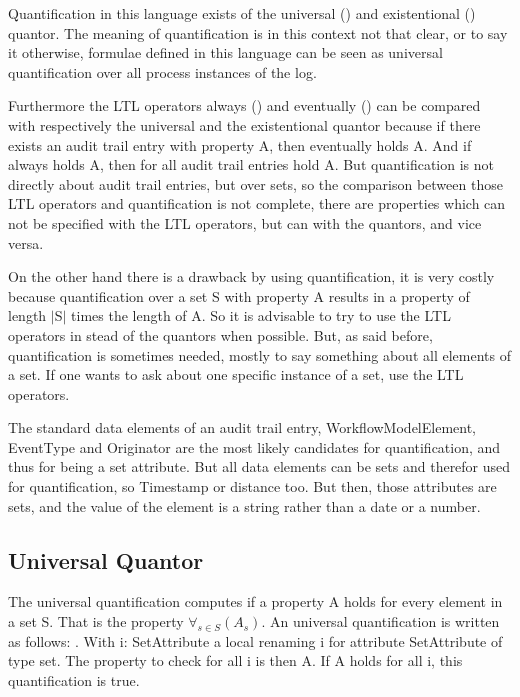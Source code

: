 Quantification in this language exists of the universal () and
existentional () quantor. The meaning of quantification is in this context not that
clear, or to say it otherwise, formulae defined in this language can be seen
as universal quantification over all process instances of the log.

Furthermore the LTL operators always (\ltl{[]}) and eventually (\ltl{$<>$}) can
be compared with respectively the universal and the existentional quantor
because if there exists an audit trail entry with
property A, then eventually holds A. And if always holds A, then for all audit
trail entries hold A. But quantification is not directly about audit trail
entries, but over sets, so the comparison between those LTL operators and
quantification is not complete, there are properties which can not be
specified with the LTL operators, but can with the quantors, and vice versa. 

On the other hand there is a drawback by using quantification, it is very costly because quantification over a set
S with property A results in a property of length $|$S$|$ times the length of A. So it is
advisable to try to use the LTL operators in stead of the quantors when
possible. But, as said before, quantification is sometimes needed, mostly to say something about all
elements of a set. If one wants to ask about one specific instance of a set,
use the LTL operators.

The standard data elements of an audit trail entry, WorkflowModelElement,
EventType and Originator are the most likely candidates for quantification,
and thus for being a set attribute. But all data elements can be sets and
therefor used for quantification, so Timestamp or distance too. But then, those attributes are sets, and the value
of the element is a string rather than a date or a number.

\subsection{Universal Quantor}
\label{language:forall}

The universal quantification computes if a property A holds for every element
in a set S. That is the property $\forall_{s \in S}(A_s)$. An universal
quantification is written as follows: . With i: SetAttribute a local renaming i for
attribute SetAttribute of type set. The property to check for all i is then A.
If A holds for all i, this quantification is true.

